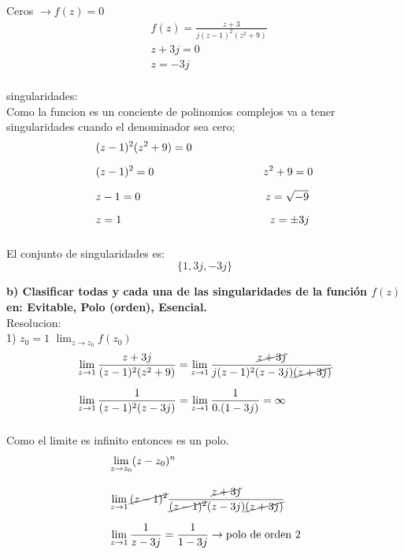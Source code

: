 \documentclass[12pt]{report}
\begin{document}
Ceros $\rightarrow f(z)=0$\\

\begin{align*}
&f(z)=\frac{z + 3}{j(z - 1)^2(z^2 + 9)}\\[6pt]
&z+3j=0\\[6pt]
&z=-3j\\[6pt]
\end{align*}
    
singularidades:\\

Como la funcion es un conciente de polinomios complejos va a tener singularidades cuando el denominador sea cero;\\

\begin{align*}
    &(z-1)^2(z^2+9)=0\\[6pt]
    &(z-1)^2=0 \hspace{3.5cm}    z^2+9=0\\[6pt]
    &z-1=0     \hspace{4cm}   z=\sqrt{-9}\\[6pt]
    &z=1       \hspace{4.75cm}  z=\pm3j\\[6pt]
\end{align*}

El conjunto de singularidades es: $$\{1,3j,-3j\}$$

\textbf{b) Clasificar todas y cada una de las singularidades de la función $f(z)$ en: Evitable, Polo (orden), Esencial.}\\[6pt]
Resolucion:\\

1) $z_0=1$ \hspace{3cm} $\lim_{z \to z_0}f(z_0)$\\[10pt]

\begin{align*}
&\lim_{z \to 1}\frac{z+3j}{(z - 1)^2(z^2 + 9)}=\lim_{z \to 1}\frac{\cancel{z+3j}}{j(z - 1)^2(z-3j)\cancel{(z+3j)}}\\[6pt]
&\lim_{z \to 1}\frac{1}{(z - 1)^2(z-3j)}=\lim_{z \to 1}\frac{1}{0.(1-3j)}=\infty\\[6pt]
\end{align*}

Como el limite es infinito entonces es un polo.\\

\begin{align*}
&\lim_{z \to z_0}(z-z_0)^n\\[10pt]
&\lim_{z \to 1}\cancel{(z - 1)^2}\frac{\cancel{z+3j}}{\cancel{(z - 1)^2}(z-3j)\cancel{(z+3j)}}\\[6pt]
&\lim_{z \to 1}\frac{1}{z-3j}=\frac{1}{1-3j}\rightarrow \text{polo de orden 2}\\[12pt]
\end{align*}
\end{document}
